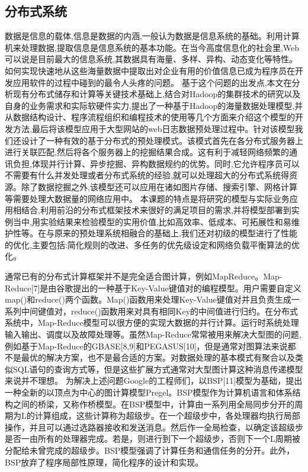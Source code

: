 \subsection{分布式系统}
数据是信息的载体,信息是数据的内涵,一般认为数据是信息系统的基础。利用计算机来处理数据,提取信息是信息系统的基本功能。在当今高度信息化的社会里,Web可以说是目前最大的信息系统,其数据具有海量、多样、异构、动态变化等特性。如何实现快速地从这些海量数据中提取出对企业有用的价值信息已成为程序员在开发应用软件的过程中碰到的最令人头疼的问题。 基于这个问题的出发点,本文在分析现有分布式储存和计算等关键技术基础上,结合对Hadoop的集群技术的研究以及自身的业务需求和实际软硬件实力,提出了一种基于Hadoop的海量数据处理模型,并从数据结构设计、程序流程组织和编程技术的使用等几个方面来介绍这个模型的开发方法,最后将该模型应用于大型网站的web日志数据预处理过程中。针对该模型我们还设计了一种有效的基于分布式的预处理模式。该模式首先在各分布式服务器上进行关联匹配,然后将各个服务器上的挖掘结果合成。这有利于减轻网络频繁的通讯负担,体现并行计算、异步挖掘、异构数据规约的优势。同时,它允许程序员可以不需要有什么并发处理或者分布式系统的经验,就可以处理超大的分布式系统得资源。除了数据挖掘之外,该模型还可以应用在诸如图片存储、搜索引擎、网格计算等需要处理大数据量的网络应用中。 本课题的特点是将研究的模型与实际业务应用相结合,利用前沿的分布式框架技术来很好的满足项目的需求,并将模型部署到实例当中,用实验结果来检验模型的实用价值,比如高效率、低成本、可拓展性和易维护性等。在与原来的预处理系统相融合的基础上,我们还对初级的模型进行了性能的优化,主要包括:简化规则的改进、多任务的优先级设定和网络负载平衡算法的优化。


通常已有的分布式计算框架并不是完全适合图计算，例如MapReduce。Map-Reduce[7]是由谷歌提出的一种基于Key-Value键值对的编程模型。用户需要自定义map()和reduce()两个函数。Map()函数用来处理Key-Value键值对并且负责生成一系列中间键值对，reduce()函数用来对具有相同Key的中间值进行归约。在分布式系统中，Map-Reduce模型可以很方便的实现大数据的并行计算。运行时系统处理输入输出、调度以及故障处理等。虽然Map-Reduce常常被用来解决大型图的问题,例如基于Map-Reduce的GBASE[8,9]和PEGASUS[10]，但是通常对图算法来说都不是最优的解决方案，也不是最合适的方案。对数据处理的基本模式有聚合以及类似SQL语句的查询方式等，但是这些扩展方式通常对大型图计算这种消息传递模型来说并不理想。
为解决上述问题Google的工程师们，以BSP[11]模型为基础，提出一种全新的以顶点为中心的图计算模型Pregel。BSP模型作为计算机语言和体系结构之间的桥梁，又称作桥模型。在BSP模型中，计算由一系列用全局同步分开的周期为L的计算组成，这些计算称为超级步。在一个超级步中，各处理器均执行局部操作，并且可以通过选路器接收和发送消息。然后作一全局检查，以确定该超级步是否一由所有的处理器完成。若是，则进行到下一个超级步，否则下一个L周期被分配给未曾完成的超级步。BSP模型强调了计算任务和通信任务的分开。此外，BSP放弃了程序局部性原理，简化程序的设计和实现。

